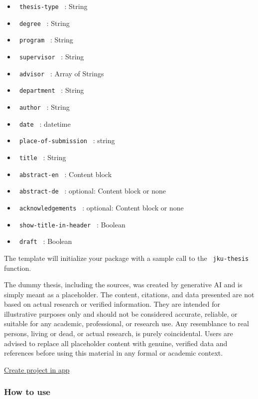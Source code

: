 \begin{itemize}
\tightlist
\item
  \texttt{\ thesis-type\ } : String
\item
  \texttt{\ degree\ } : String
\item
  \texttt{\ program\ } : String
\item
  \texttt{\ supervisor\ } : String
\item
  \texttt{\ advisor\ } : Array of Strings
\item
  \texttt{\ department\ } : String
\item
  \texttt{\ author\ } : String
\item
  \texttt{\ date\ } : datetime
\item
  \texttt{\ place-of-submission\ } : string
\item
  \texttt{\ title\ } : String
\item
  \texttt{\ abstract-en\ } : Content block
\item
  \texttt{\ abstract-de\ } : optional: Content block or none
\item
  \texttt{\ acknowledgements\ } : optional: Content block or none
\item
  \texttt{\ show-title-in-header\ } : Boolean
\item
  \texttt{\ draft\ } : Boolean
\end{itemize}

The template will initialize your package with a sample call to the
\texttt{\ jku-thesis\ } function.

The dummy thesis, including the sources, was created by generative AI
and is simply meant as a placeholder. The content, citations, and data
presented are not based on actual research or verified information. They
are intended for illustrative purposes only and should not be considered
accurate, reliable, or suitable for any academic, professional, or
research use. Any resemblance to real persons, living or dead, or actual
research, is purely coincidental. Users are advised to replace all
placeholder content with genuine, verified data and references before
using this material in any formal or academic context.

\href{/app?template=not-jku-thesis&version=0.1.0}{Create project in app}

\subsubsection{How to use}\label{how-to-use}

